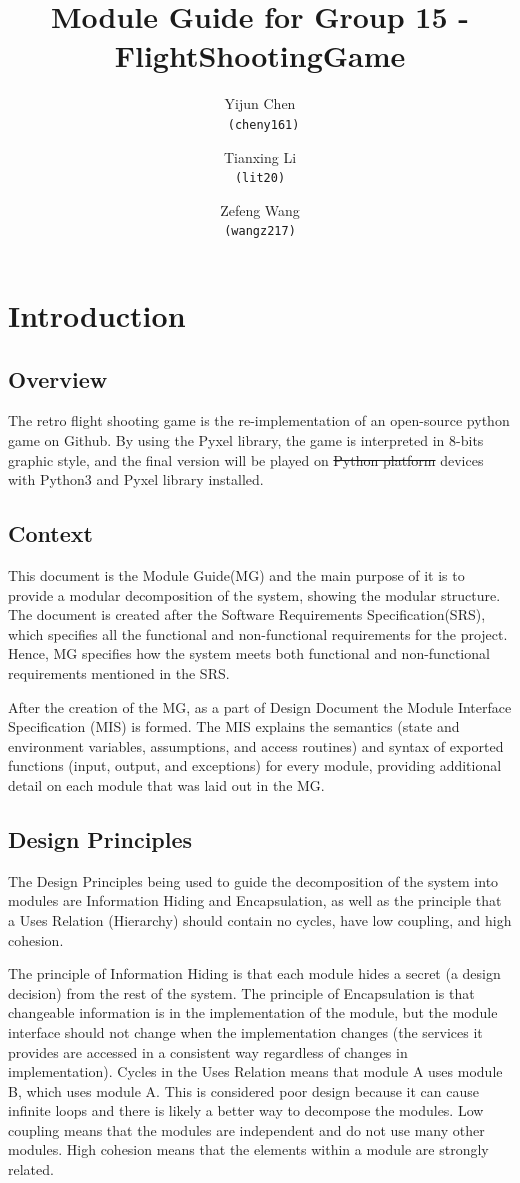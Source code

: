 \documentclass[12,english]{article}
\title{Module Guide for Group 15 - FlightShootingGame}
\author{Yijun Chen\\
\texttt{ (cheny161)}
\and
Tianxing Li\\
\texttt{(lit20)}
\and
Zefeng Wang\\
\texttt{(wangz217)}
}
\date{}
\begin{document}
\maketitle
\newpage
\tableofcontents
\newpage

\section{Introduction}
	\subsection{Overview}
	The retro flight shooting game is the re-implementation of an open-source python game on Github. By using the Pyxel library, the game is interpreted in 8-bits graphic style, and the final version will be played on \sout{Python platform} {\color{red}devices with Python3 and Pyxel library installed}.
	\subsection{Context}
	This document is the Module Guide(MG) and the main purpose of it is to provide a modular decomposition of the system, showing the modular structure. The document is created after the Software Requirements Specification(SRS), which specifies all the functional and non-functional requirements for the project. Hence, MG specifies how the system meets both functional and non-functional requirements mentioned in the SRS. \cite{b2}

After the creation of the MG, as a part of Design Document the Module Interface Specification (MIS) is formed. The MIS explains the semantics (state and environment variables, assumptions, and access routines) and syntax of exported functions (input, output, and exceptions) for every module, providing additional detail on each module that was laid out in the MG.\cite{b2}
	\subsection{Design Principles}
	
	The Design Principles being used to guide the decomposition of the system into modules are Information Hiding and Encapsulation, as well as the principle that a Uses Relation (Hierarchy) should contain no cycles, have low coupling, and high cohesion. \cite{b2}

The principle of Information Hiding is that each module hides a secret (a design decision) from the rest of the system. The principle of Encapsulation is that changeable information is in the implementation of the module, but the module interface should not change when the implementation changes (the services it provides are accessed in a consistent way regardless of changes in implementation). Cycles in the Uses Relation means that module A uses module B, which uses module A. This is considered poor design because it can cause infinite loops and there is likely a better way to decompose the modules. Low coupling means that the modules are independent and do not use many other modules. High cohesion means that the elements within a module are strongly related.\cite{b2}
\end{document}
